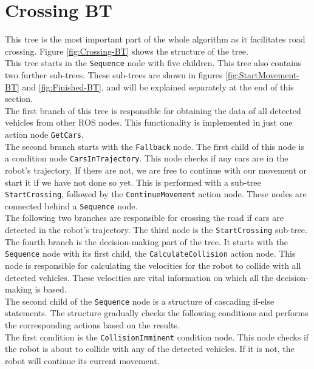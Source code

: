 \section{Crossing BT}
\label{sec:Crossing-BT}
    This tree is the most important part of the whole algorithm as it facilitates road crossing. Figure \ref{fig:Crossing-BT} shows the structure of the tree.\\
    This tree starts in the \texttt{Sequence} node with five children. This tree also contains two further sub-trees. These sub-trees are shown in figures \ref{fig:StartMovement-BT} and \ref{fig:Finished-BT}, and will be explained separately at the end of this section.\\
    The first branch of this tree is responsible for obtaining the data of all detected vehicles from other ROS nodes. This functionality is implemented in just one action node \texttt{GetCars}.\\
    The second branch starts with the \texttt{Fallback} node. The first child of this node is a condition node \texttt{CarsInTrajectory}. This node checks if any cars are in the robot's trajectory. If there are not, we are free to continue with our movement or start it if we have not done so yet. This is performed with a sub-tree \texttt{StartCrossing}, followed by the \texttt{ContinueMovement} action node. These nodes are connected behind a \texttt{Sequence} node.\\
    The following two branches are responsible for crossing the road if cars are detected in the robot's trajectory. The third node is the \texttt{StartCrossing} sub-tree.\\
    The fourth branch is the decision-making part of the tree. It starts with the \texttt{Sequence} node with its first child, the \texttt{CalculateCollision} action node. This node is responsible for calculating the velocities for the robot to collide with all detected vehicles. These velocities are vital information on which all the decision-making is based.\\
    The second child of the \texttt{Sequence} node is a structure of cascading if-else statements. The structure gradually checks the following conditions and performs the corresponding actions based on the results.\\
    The first condition is the \texttt{CollisionImminent} condition node. This node checks if the robot is about to collide with any of the detected vehicles. If it is not, the robot will continue its current movement.\\
